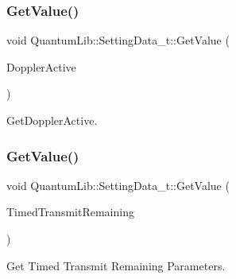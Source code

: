 \subsubsection{\texorpdfstring{Get\+Value()}{GetValue()}\hspace{0.1cm}{\footnotesize\ttfamily [21/26]}}
{\footnotesize\ttfamily void Quantum\+Lib\+::\+Setting\+Data\+\_\+t\+::\+Get\+Value (\begin{DoxyParamCaption}\item[{\mbox{\hyperlink{namespace_quantum_lib_a7a034f49c93f16195096c2ecf89432d4}{e\+Doppler\+Active\+\_\+t}} \&}]{Doppler\+Active }\end{DoxyParamCaption})\hspace{0.3cm}{\ttfamily [inline]}}



Get\+Doppler\+Active. 

\mbox{\label{struct_quantum_lib_1_1_setting_data__t_a09948ecc76dd4444419361ed394ae514}} 
\subsubsection{\texorpdfstring{Get\+Value()}{GetValue()}\hspace{0.1cm}{\footnotesize\ttfamily [22/26]}}
{\footnotesize\ttfamily void Quantum\+Lib\+::\+Setting\+Data\+\_\+t\+::\+Get\+Value (\begin{DoxyParamCaption}\item[{\mbox{\hyperlink{struct_quantum_lib_1_1_timed_transmit_remaining__t}{Timed\+Transmit\+Remaining\+\_\+t}} \&}]{Timed\+Transmit\+Remaining }\end{DoxyParamCaption})\hspace{0.3cm}{\ttfamily [inline]}}



Get Timed Transmit Remaining Parameters. 

\mbox{\label{struct_quantum_lib_1_1_setting_data__t_a3fa9a1812192d33a14dbdbc8340ce9ea}} 
